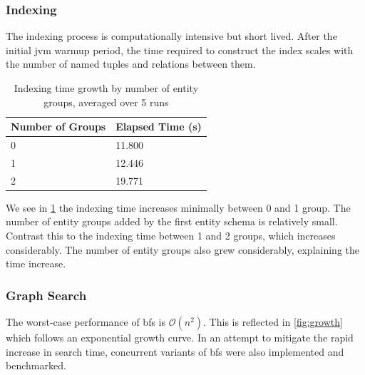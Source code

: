 			\subsubsection{Indexing}
				The indexing process is computationally intensive but short lived.  After the initial \gls{jvm} warmup period, the time required to construct the index scales with the number of named tuples and relations between them.
				
				\begin{table}
					\centering
					\begin{tabular}{ll}
						\toprule
						Number of Groups & Elapsed Time (s) \\
						\midrule
						0 & 11.800 \\
						1 & 12.446 \\
						2 & 19.771 \\
						\bottomrule
					\end{tabular}
					
					\caption{Indexing time growth by number of entity groups, averaged over 5 runs}
					\label{tbl:index-growth-entity-groups}
				\end{table}
				
				We see in \cref{tbl:index-growth-entity-groups} the indexing time increases minimally between 0 and 1 group.  The number of entity groups added by the first entity schema is relatively small.  Contrast this to the indexing time between 1 and 2 groups, which increases considerably.  The number of entity groups also grew considerably, explaining the time increase.
			
			\subsubsection{Graph Search}
				The worst-case performance of \gls{bfs} is \(\mathcal{O}(n^2)\).  This is reflected in \cref{fig:growth} which follows an exponential growth curve.  In an attempt to mitigate the rapid increase in search time, concurrent variants of \gls{bfs} were also implemented and benchmarked.
				
